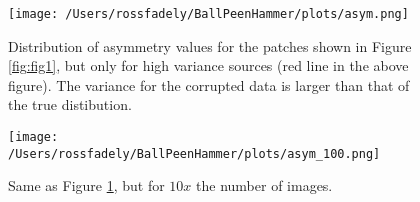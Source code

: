 \documentclass[12pt,preprint,pdftex]{aastex}
\begin{document}
\begin{figure}
\centering
 \texttt{[image: /Users/rossfadely/BallPeenHammer/plots/asym.png]}
\caption{Distribution of asymmetry values for the patches shown in Figure \ref{fig:fig1}, but only for high variance sources (red line in the above figure).  The variance for the corrupted data is larger than that of the true distibution.}
\label{fig:fig2}
\end{figure}

\begin{figure}
\centering
 \texttt{[image: /Users/rossfadely/BallPeenHammer/plots/asym\_100.png]}
\caption{Same as Figure \ref{fig:fig2}, but for $10x$ the number of images.}
\label{fig:fig3}
\end{figure}
\end{document}
